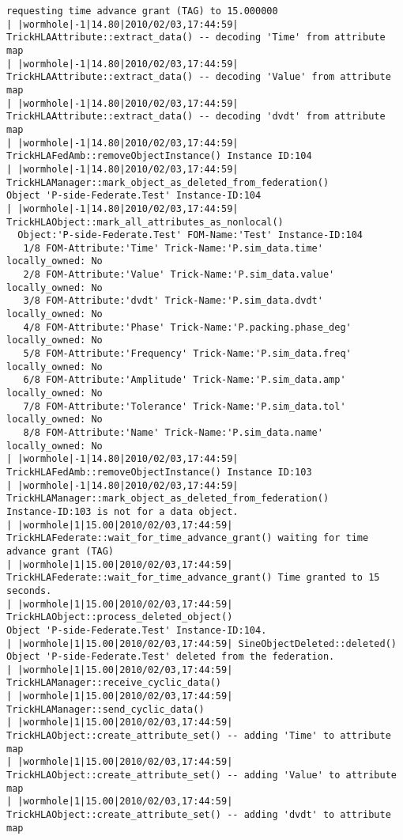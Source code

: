 \begin{lstlisting}[numbers=none,caption={output showing conditionally sent cyclic data}]
requesting time advance grant (TAG) to 15.000000
| |wormhole|-1|14.80|2010/02/03,17:44:59| TrickHLAAttribute::extract_data() -- decoding 'Time' from attribute map
| |wormhole|-1|14.80|2010/02/03,17:44:59| TrickHLAAttribute::extract_data() -- decoding 'Value' from attribute map
| |wormhole|-1|14.80|2010/02/03,17:44:59| TrickHLAAttribute::extract_data() -- decoding 'dvdt' from attribute map
| |wormhole|-1|14.80|2010/02/03,17:44:59| TrickHLAFedAmb::removeObjectInstance() Instance ID:104
| |wormhole|-1|14.80|2010/02/03,17:44:59| TrickHLAManager::mark_object_as_deleted_from_federation()
Object 'P-side-Federate.Test' Instance-ID:104
| |wormhole|-1|14.80|2010/02/03,17:44:59| TrickHLAObject::mark_all_attributes_as_nonlocal()
  Object:'P-side-Federate.Test' FOM-Name:'Test' Instance-ID:104
   1/8 FOM-Attribute:'Time' Trick-Name:'P.sim_data.time' locally_owned: No
   2/8 FOM-Attribute:'Value' Trick-Name:'P.sim_data.value' locally_owned: No
   3/8 FOM-Attribute:'dvdt' Trick-Name:'P.sim_data.dvdt' locally_owned: No
   4/8 FOM-Attribute:'Phase' Trick-Name:'P.packing.phase_deg' locally_owned: No
   5/8 FOM-Attribute:'Frequency' Trick-Name:'P.sim_data.freq' locally_owned: No
   6/8 FOM-Attribute:'Amplitude' Trick-Name:'P.sim_data.amp' locally_owned: No
   7/8 FOM-Attribute:'Tolerance' Trick-Name:'P.sim_data.tol' locally_owned: No
   8/8 FOM-Attribute:'Name' Trick-Name:'P.sim_data.name' locally_owned: No
| |wormhole|-1|14.80|2010/02/03,17:44:59| TrickHLAFedAmb::removeObjectInstance() Instance ID:103
| |wormhole|-1|14.80|2010/02/03,17:44:59| TrickHLAManager::mark_object_as_deleted_from_federation() 
Instance-ID:103 is not for a data object.
| |wormhole|1|15.00|2010/02/03,17:44:59| TrickHLAFederate::wait_for_time_advance_grant() waiting for time advance grant (TAG)
| |wormhole|1|15.00|2010/02/03,17:44:59| TrickHLAFederate::wait_for_time_advance_grant() Time granted to 15 seconds.
| |wormhole|1|15.00|2010/02/03,17:44:59| TrickHLAObject::process_deleted_object() 
Object 'P-side-Federate.Test' Instance-ID:104.
| |wormhole|1|15.00|2010/02/03,17:44:59| SineObjectDeleted::deleted() 
Object 'P-side-Federate.Test' deleted from the federation.
| |wormhole|1|15.00|2010/02/03,17:44:59| TrickHLAManager::receive_cyclic_data()
| |wormhole|1|15.00|2010/02/03,17:44:59| TrickHLAManager::send_cyclic_data()
| |wormhole|1|15.00|2010/02/03,17:44:59| TrickHLAObject::create_attribute_set() -- adding 'Time' to attribute map
| |wormhole|1|15.00|2010/02/03,17:44:59| TrickHLAObject::create_attribute_set() -- adding 'Value' to attribute map
| |wormhole|1|15.00|2010/02/03,17:44:59| TrickHLAObject::create_attribute_set() -- adding 'dvdt' to attribute map

\end{lstlisting}
